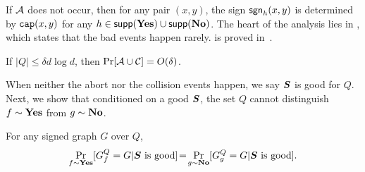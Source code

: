 \noindent If ${\cal A}$ does not occur, then for any pair $(x,y)$, the sign $\mathsf{sgn}_h(x,y)$ is determined by $\mathtt{cap}(x,y)$ for any $h\in \mathsf{supp}(\mathbf{Yes})\cup \mathsf{supp}(\mathbf {No})$.
The heart of the analysis lies in , which states that the bad events happen rarely.
 is proved in~.

\begin{theorem} \label{thm:bad} If $|Q| \leq \delta d\log d$,
then $\Pr[{\cal A} \cup {\cal C}] = O(\delta)$.
\end{theorem}

\noindent When neither the abort nor the collision events happen,
we say $\boldsymbol{S}$ is good for $Q$.
Next, we show that conditioned on a good $\boldsymbol{S}$,
the set $Q$ cannot distinguish $f \sim \mathbf{Yes}$ from $g \sim \mathbf {No}$.

\begin{lemma}\label{lem:zero}
For any signed graph $G$ over $Q$,
$$\Pr_{f\sim \mathbf{Yes}} [G^Q_f = G|\boldsymbol{S} \textrm{ is good}] \!=\! \Pr_{g\sim \mathbf {No}} [G^Q_g = G|\boldsymbol{S} \textrm{ is good}].$$
\end{lemma}
